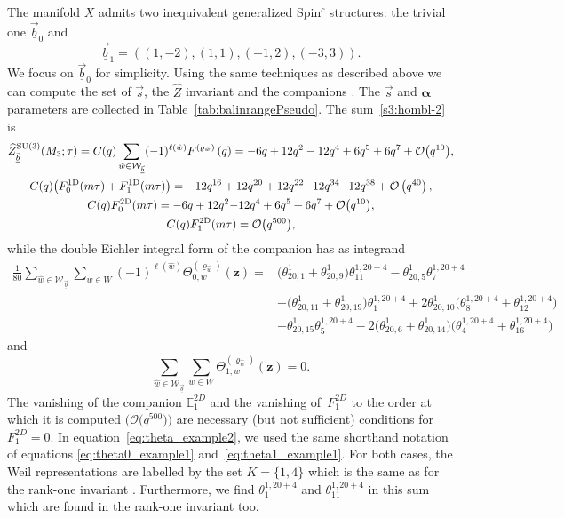 \documentclass[10pt,a4paper]{amsart}
\def\BE{\mathbb{E}}
\def\bv{{\vec{\underline{b}}}}
\def\bal{\boldsymbol{\alpha}}
\theoremstyle{definition}
\numberwithin{equation}{section}
\begin{document}
The manifold $X$ admits two inequivalent generalized Spin$^c$ structures: the trivial one $\vec{\underline{b}}_0$ and
\begin{equation*}
\vec{\underline{b}}_{1}= ( (1, -2 ), (1, 1 ), (-1, 2 ), (-3, 3 ) ).
\end{equation*}
 We focus on $\vec{\underline{b}}_{0}$ for simplicity. Using the same techniques as described above we can compute the set of $\vec{s}$, the $\widehat{Z}$ invariant and the companions . The $\vec{s}$ and $\bal$ parameters are collected in Table~\ref{tab:balinrangePseudo}. The sum~\eqref{s3:hombl-2} is
\begin{gather*}
 \widehat Z^{{\rm SU}(3)}_\bv(M_3;\tau)= C(q)\sum_{\hat{w}\in\mathcal W_{\vec{\underline{b}}}}(-1)^{\ell(\hat{w})}F^{\left( \varrho_{\hat{w}} \right)}\left( q \right)= -6q + 12q^2 -12q^4 + 6q^5 + 6q^7 + \mathcal{O}\bigl(q^{10}\bigr),\\
 C(q)\bigl(F_{0}^{\text{1D}}(m\tau)+F_{1}^{\text{1D}}(m\tau)\bigr) ={-12} q^{16} + 12 q^{20} + 12 q^{22} {-12} q^{34} {-12} q^{38} + \mathcal{O}\left(q^{40}\right), \\
 C(q)F_{0}^{\text{2D}}(m\tau) = {-6} q + 12 q^{2} {-12} q^{4} + 6 q^{5} + 6 q^{7} + \mathcal{O}\bigl(q^{10}\bigr),
\\
 C(q)F_{1}^{\text{2D}}(m\tau) = \mathcal{O}\bigl( q^{500} \bigr),
\end{gather*}
while the double Eichler integral form of the companion has as integrand
\begin{align}
\frac{1}{80} \sum_{\hat{w}\in \mathcal{W}_{\vec{\underline{b}}}}\sum_{w\in W}(-1)^{\ell(\hat{w})}\Theta^{(\varrho_{\hat{w}})}_{0,w}(\mathbf z) ={}& \bigl(\theta^{1}_{20,1}+\theta^{1}_{20,9}\bigr)\theta_{11}^{1,20+4}-\theta^{1}_{20,5}\theta_{7}^{1,20+4}\nonumber\\
 &-\bigl(\theta^{1}_{20,11}+\theta^{1}_{20,19}\bigr)\theta_{1}^{1,20+4}+2\theta^{1}_{20,10}\bigl(\theta^{1,20+4}_{8}+\theta^{1,20+4}_{12}\bigr)\nonumber\\
 &-\theta^{1}_{20,15}\theta_{5}^{1,20+4}-2\bigl(\theta^{1}_{20,6}+\theta^{1}_{20,14}\bigr)\bigl(\theta^{1,20+4}_{4}+\theta^{1,20+4}_{16}\bigr)\!\!\!\label{eq:theta_example2}
\end{align}
and
\[\sum_{\hat{w}\in \mathcal{W}_{\vec{\underline{b}}}}\sum_{w\in W}\Theta^{(\varrho_{\hat{w}})}_{1,w}(\mathbf z)=0.\]
The vanishing of the companion $\BE_{1}^{2D}$ and the vanishing of~$F_{1}^{2D}$ to the order at which it is computed $\bigl(\mathcal{O}\bigl(q^{500}\bigr)\bigr)$ are necessary (but not sufficient) conditions for~$F_{1}^{2D}=0$.
In equation~\eqref{eq:theta_example2}, we used the same shorthand notation of equations \eqref{eq:theta0_example1} and~\eqref{eq:theta1_example1}. For both cases, the Weil representations are labelled by the set $K= \{ 1,4 \}$ which is the same as for the rank-one invariant  \cite{cheng20193d}. Furthermore, we find $\theta_{1}^{1,20+4}$ and $\theta_{11}^{1,20+4}$ in this sum which are found in the rank-one invariant too.
\end{document}
